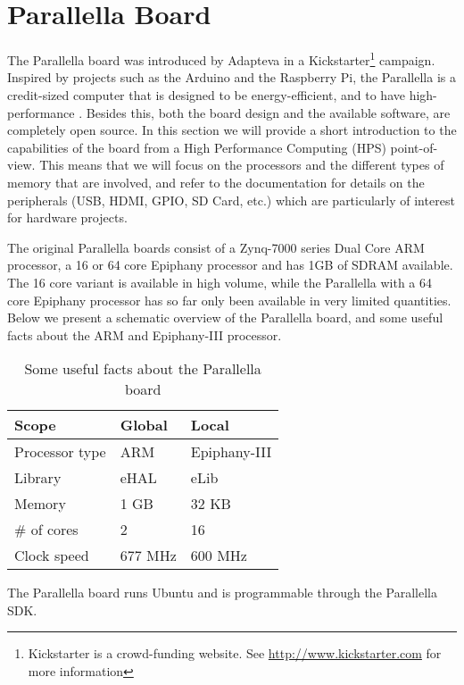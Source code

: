 \documentclass[fleqn]{article}
\renewcommand{\(}{\left(}
\renewcommand{\)}{\right)}
\newcommand{\tm}{\textsuperscript{\texttrademark}}
\begin{document}
\section{Parallella Board}

The Parallella board was introduced by Adapteva in a Kickstarter\footnote{Kickstarter is a crowd-funding website. See \url{http://www.kickstarter.com} for more information} campaign. Inspired by projects such as the Arduino and the Raspberry Pi, the Parallella is a credit-sized computer that is designed to be energy-efficient, and to have high-performance \cite{par:manual}. Besides this, both the board design and the available software, are completely open source. In this section we will provide a short introduction to the capabilities of the board from a High Performance Computing (HPS) point-of-view. This means that we will focus on the processors and the different types of memory that are involved, and refer to the documentation for details on the peripherals (USB, HDMI, GPIO, SD Card, etc.) which are particularly of interest for hardware projects. 

The original Parallella boards consist of a Zynq-7000 series Dual Core ARM processor, a 16 or 64 core Epiphany processor and has 1GB of SDRAM available. The 16 core variant is available in high volume, while the Parallella with a 64 core Epiphany processor has so far only been available in very limited quantities. Below we present a schematic overview of the Parallella board, and some useful facts about the ARM and Epiphany-III processor.

\begin{table}[h]
\centering
\begin{tabular}{l|ll}
Scope & Global & Local \\
\hline
Processor type & ARM & Epiphany-III\tm \\
Library & eHAL & eLib \\
Memory & 1 GB & 32 KB \\
\# of cores & 2 & 16 \\
Clock speed & 677 MHz & 600 MHz\\

\end{tabular}
\caption{Some useful facts about the Parallella board}
\end{table}




The Parallella board runs Ubuntu and is programmable through the Parallella SDK.
\end{document}
